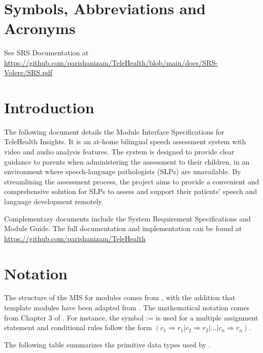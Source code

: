 \documentclass[12pt, titlepage]{article}
\begin{document}
~\newpage

\section{Symbols, Abbreviations and Acronyms}

See SRS Documentation at \url{https://github.com/parishanizam/TeleHealth/blob/main/docs/SRS-Volere/SRS.pdf}

\newpage

\tableofcontents

\newpage


\section{Introduction}

The following document details the Module Interface Specifications for TeleHealth Insights. It is an at-home bilingual speech 
assessment system with video and audio analysis features. The system is designed 
to provide clear guidance to parents when administering the assessment to their 
children, in an environment where speech-language pathologists (SLPs) are 
unavailable. By streamlining the assessment process, the project aims to provide a 
convenient and comprehensive solution for SLPs to assess and support their patients'
speech and language development remotely.

Complementary documents include the System Requirement Specifications
and Module Guide.  The full documentation and implementation can be
found at \url{https://github.com/parishanizam/TeleHealth} 

\section{Notation}

The structure of the MIS for modules comes from \citet{HoffmanAndStrooper1995},
with the addition that template modules have been adapted from
\cite{GhezziEtAl2003}.  The mathematical notation comes from Chapter 3 of
\citet{HoffmanAndStrooper1995}.  For instance, the symbol := is used for a
multiple assignment statement and conditional rules follow the form $(c_1
\Rightarrow r_1 | c_2 \Rightarrow r_2 | ... | c_n \Rightarrow r_n )$.

The following table summarizes the primitive data types used by \progname. 
\end{document}
